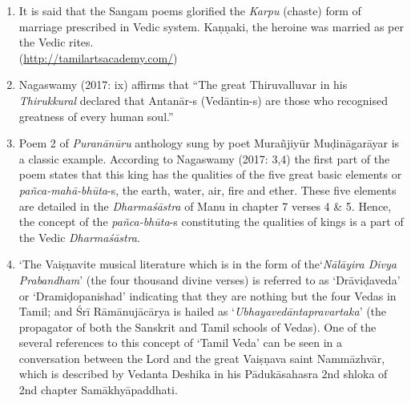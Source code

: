 \begin{enumerate}[{\rm 1.}]
\itemsep=0pt
\item It is said that the Sangam poems glorified the \textit{Karpu }(chaste) form of marriage prescribed in Vedic system. Kaṇṇaki, the heroine was married as per the Vedic rites.\\ (\url{http://tamilartsacademy.com/})

 \item Nagaswamy (2017: ix) affirms that “The great Thiruvalluvar in his \textit{Thirukkural} declared that Antanār-s (Vedāntin-s) are those who recognised greatness of every human soul.”

 \item Poem 2 of \textit{Puranānūru} anthology sung by poet Murañjiyūr Muḍināgarāyar is a classic example. According to Nagaswamy (2017: 3,4) the first part of the poem states that this king has the qualities of the five great basic elements or \textit{pañca-mahā-bhūta}-s, the earth, water, air, fire and ether. These five elements are detailed in the \textit{Dharmaśāstra} of Manu in chapter 7 verses 4 \& 5. Hence, the concept of the \textit{pañca-bhūta}-s constituting the qualities of kings is a part of the Vedic \textit{Dharmaśāstra}.

 \item 
 ‘The Vaiṣṇavite musical literature which is in the form of the\break ‘\textit{Nālāyira Divya Prabandham}’ (the four thousand divine verses) is referred to as ‘Drāviḍaveda’ or ‘Dramiḍopanishad’ indicating that they are nothing but the four Vedas in Tamil; and Śrī Rāmānujācārya is hailed as ‘\textit{Ubhayavedāntapravartaka}’ (the propagator of both the Sanskrit and Tamil schools of Vedas). One of the several references to this concept of ‘Tamil Veda’ can be seen in a conversation between the Lord and the great Vaiṣṇava saint Nammāzhvār, which is described by Vedanta Deshika in his Pādukāsahasra 2nd shloka of 2nd chapter Samākhyāpaddhati.


\end{enumerate}
